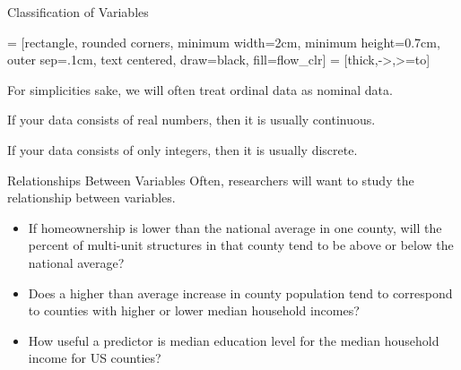 \documentclass{beamer}
\begin{document}
\begin{frame}
\begin{block}{Classification of Variables}
\begin{center}
 = [rectangle, rounded corners, minimum width=2cm, minimum height=0.7cm, outer sep=.1cm, text centered, draw=black, fill=flow_clr]
 = [thick,->,>=to]
\end{center}
\end{block}\pause

\begin{note}
For simplicities sake, we will often treat ordinal data as nominal data.
\end{note}\pause 
\begin{note} 
If your data consists of real numbers, then it is usually continuous.
\end{note}\pause

\begin{note}
If your data consists of only integers, then it is usually discrete.
\end{note}
\end{frame}

\begin{frame}
\begin{block}{Relationships Between Variables}
Often, researchers will want to study the relationship between variables.\pause

\begin{itemize}
\item If homeownership is lower than the national average in one county, will the percent of multi-unit structures in that county tend to be above or below the national average?\pause
\item Does a higher than average increase in county population tend to correspond to counties with higher or lower median household incomes?\pause
\item How useful a predictor is median education level for the median household income for US counties?
\end{itemize}
\end{block}
\end{frame}
\end{document}
